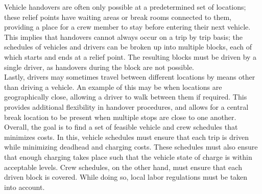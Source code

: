 \documentclass[]{article}
\begin{document}
Vehicle handovers are often only possible at a predetermined set of locations; these relief points have waiting areas or break rooms connected to them, providing a place for a crew member to stay before entering their next vehicle. This implies that handovers cannot always occur on a trip by trip basis; the schedules of vehicles and drivers can be broken up into multiple blocks, each of which starts and ends at a relief point. The resulting blocks must be driven by a single driver, as handovers during the block are not possible. \\
Lastly, drivers may sometimes travel between different locations by means other than driving a vehicle. An example of this may be when locations are geographically close, allowing a driver to walk between them if required. This provides additional flexibility in handover procedures, and allows for a central break location to be present when multiple stops are close to one another. \\
Overall, the goal is to find a set of feasible vehicle and crew schedules that minimizes costs. In this, vehicle schedules must ensure that each trip is driven while minimizing deadhead and charging costs. These schedules must also ensure that enough charging takes place such that the vehicle state of charge is within acceptable levels. Crew schedules, on the other hand, must ensure that each driven block is covered. While doing so, local labor regulations must be taken into account.
\end{document}
